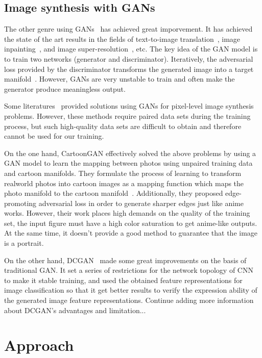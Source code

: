 \documentclass[10pt,twocolumn,letterpaper]{article}
\begin{document}
\subsection{Image synthesis with GANs}
The other genre using GANs~\cite{GAN} has achieved great imporvement. It has achieved
the state of the art results in the fields of text-to-image translation~\cite{reed2016generative}, image
inpainting~\cite{yeh2016semantic}, and image super-resolution~\cite{ledig2017photo}, etc. The key idea of the GAN model
is to train two networks (generator and discriminator). Iteratively,
the adversarial loss provided by the discriminator transforms the
generated image into a target manifold~\cite{yeh2016semantic}. However, GANs are very unstable to train and
often make the generator produce meaningless output.

Some literatures~\cite{dumoulin2016adversarially,isola2017image,karacan2016learning} provided solutions using GANs for pixel-level image
synthesis problems. However, these methods require paired data sets
during the training process, but such high-quality data sets are
difficult to obtain and therefore cannot be used for our training.

On the one hand, CartoonGAN effectively solved the above problems by using a GAN model
to learn the mapping between photos using unpaired training data and
cartoon manifolds. They formulate the process of learning to transform realworld
photos into cartoon images as a mapping function which maps the photo
manifold to the cartoon manifold~\cite{CartoonGAN}. Additionally, they proposed
edge-promoting adversarial loss in order to generate sharper edges just like anime works.
However, their work places high demands on the quality of the training set, the input
figure must have a high color saturation to get anime-like outputs. At the same time,
it doesn't provide a good method to guarantee that the image is a portrait.

On the other hand, DCGAN~\cite{DCGAN} made some great improvements on the basis of traditional GAN.
It set a series of restrictions for the network topology of CNN to make it stable training, and
used the obtained feature representations for image classification so that it get better results
to verify the expression ability of the generated image feature representations.
{\color{red}Continue adding more information about DCGAN's advantages and limitation...}


\section{Approach}
\end{document}
